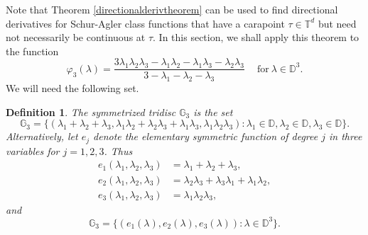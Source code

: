 \documentclass[11pt, reqno]{amsart}
\newtheorem{definition}[theorem]{Definition}
\newcommand\1{\boldsymbol {1}}
\newcommand\lam{\lambda}
\newcommand{\D}{\mathbb{D}}
\numberwithin{equation}{section}
\begin{document}
Note that Theorem \ref{directionalderivtheorem} can be used to find directional derivatives for Schur-Agler class functions that have a carapoint $\tau\in\mathbb{T}^{d}$ but need not necessarily be continuous at $\tau$. In this section, we shall apply this theorem to the function 
$$
\varphi_3(\lambda) = \dfrac{3\lambda_{1}\lambda_{2}\lambda_{3} - \lambda_{1}\lambda_{2} - \lambda_{1}\lambda_{3}-\lambda_{2}\lambda_{3}}{3-\lambda_{1}-\lambda_{2}-\lambda_{3}}\ \quad \text{for} \ \lam \in \D^3.
$$
We will need the following set.
\begin{definition}
    The symmetrized tridisc $\mathbb{G}_{3}$ is the set 
$$\mathbb{G}_{3} =\Big\{(\lambda_{1}+\lambda_{2}+\lambda_{3},\lambda_{1}\lambda_{2}+\lambda_{2}\lambda_{3}+\lambda_{1}\lambda_{3},\lambda_{1}\lambda_{2}\lambda_{3}): \lambda_{1}\in\mathbb{D}, \lambda_{2}\in\mathbb{D}, \lambda_{3}\in\mathbb{D}\Big\}.$$
Alternatively, let $e_{j}$ denote the elementary symmetric function of degree $j$ in three variables for $j=1,2,3$. Thus
\begin{align}
    e_{1}(\lambda_{1},\lambda_{2},\lambda_{3}) &= \lambda_{1} + \lambda_{2}+\lambda_{3},\nonumber\\
    e_{2}(\lambda_{1},\lambda_{2},\lambda_{3}) &= \lambda_{2}\lambda_{3}+\lambda_{3}\lambda_{1}+\lambda_{1}\lambda_{2},\nonumber\\
    e_{3}(\lambda_{1},\lambda_{2},\lambda_{3}) &= \lambda_{1}\lambda_{2}\lambda_{3},\label{symmetrixfunctions}
\end{align}
and 
$$\mathbb{G}_{3}=\bigg\{(e_{1}(\lambda),e_{2}(\lambda),e_{3}(\lambda)):\lambda\in\mathbb{D}^{3}\bigg\}.$$
\end{definition}
\end{document}
